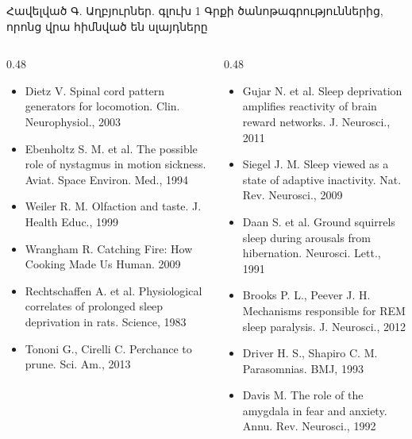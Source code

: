 \begin{frame}{Հավելված Գ. Աղբյուրներ. գլուխ 1}
  \scriptsize
  Գրքի ծանոթագրություններից, որոնց վրա հիմնված են սլայդները\par\smallskip
  \begin{columns}[T]
    \begin{column}{0.48\textwidth}
      \begin{itemize}\setlength{\itemsep}{0.4mm}
        \item Dietz V. Spinal cord pattern generators for locomotion. Clin. Neurophysiol., 2003
        \item Ebenholtz S. M. et al. The possible role of nystagmus in motion sickness. Aviat. Space Environ. Med., 1994
        \item Weiler R. M. Olfaction and taste. J. Health Educ., 1999
        \item Wrangham R. Catching Fire: How Cooking Made Us Human. 2009
        \item Rechtschaffen A. et al. Physiological correlates of prolonged sleep deprivation in rats. Science, 1983
        \item Tononi G., Cirelli C. Perchance to prune. Sci. Am., 2013
      \end{itemize}
    \end{column}
    \begin{column}{0.48\textwidth}
      \begin{itemize}\setlength{\itemsep}{0.4mm}
        \item Gujar N. et al. Sleep deprivation amplifies reactivity of brain reward networks. J. Neurosci., 2011
        \item Siegel J. M. Sleep viewed as a state of adaptive inactivity. Nat. Rev. Neurosci., 2009
        \item Daan S. et al. Ground squirrels sleep during arousals from hibernation. Neurosci. Lett., 1991
        \item Brooks P. L., Peever J. H. Mechanisms responsible for REM sleep paralysis. J. Neurosci., 2012
        \item Driver H. S., Shapiro C. M. Parasomnias. BMJ, 1993
        \item Davis M. The role of the amygdala in fear and anxiety. Annu. Rev. Neurosci., 1992
      \end{itemize}
    \end{column}
  \end{columns}
\end{frame}
